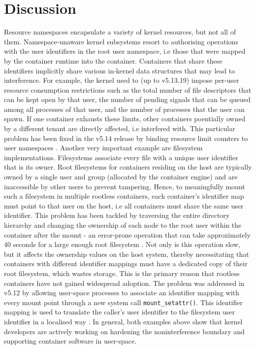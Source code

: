 \section{Discussion}
Resource namespaces encapsulate a variety of kernel resources, but not all of them.
Namespace-unaware kernel subsystems resort to authorising operations with the user identifiers 
in the root user namespace, i.e those that were mapped by the container runtime into the container.
Containers that share these identifiers implicitly share various in-kernel data structures 
that may lead to interference. For example, the kernel used to (up to v5.13.19) impose per-user resource consumption 
restrictions such as the total number of file descriptors that can be kept open by that user, the number of 
pending signals that can be queued among all processes of that user, and the number of processes 
that the user can spawn. If one container exhausts these limits, other containers poentially owned by a different tenant are directly affected, i.e 
interfered with. This particular problem has been fixed in the v5.14 release by binding resource limit counters to user namespaces
\cite{https://patchwork.kernel.org/project/linux-hardening/cover/cover.1619094428.git.legion@kernel.org/}.
Another very important example are filesystem implementations. Filesystems associate every file 
with a unique user identifier that is its owner. Root filesystems for containers residing on the 
host are typically owned by a single user and group (allocated by the container engine) and are inaccessible by other users 
to prevent tampering. Hence, to meaningfully mount such a filesystem in multiple rootless containers, 
each container's identifier map must point to that user on the host, i.e all containers must 
share the same user identifier. This problem has been tackled by traversing the entire directory hierarchy and changing the 
ownership of each node to the root user within the container after the mount - an error-prone operation 
that can take approximately 40 seconds for a large enough root filesystem \cite{https://github.com/containerd/containerd/pull/4734}.
Not only is this operation slow, but it affects the ownership values on the host system, thereby necessitating that 
containers with different identifier mappings must have a dedicated copy of their root filesystem, which wastes storage.
This is the primary reason that rootless containers have not gained widespread adoption.
The problem was addressed in v5.12 by allowing user-space processes to associate an identifier mapping with every mount point \cite{https://lwn.net/Articles/896255/} through 
a new system call \verb|mount_setattr()|.
This identifier mapping is used to translate the caller's user identifier to the filesystem user identifier in a 
localised way \cite{https://www.kernel.org/doc/html/latest/filesystems/idmappings.html}.
In general, both examples above show that kernel developers are actively working on hardening 
the noninterference boundary and supporting container software in user-space.

